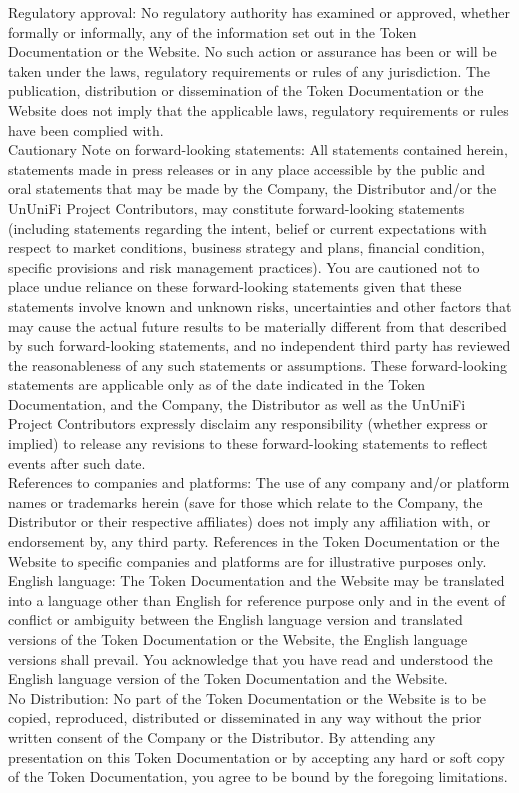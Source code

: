 \documentclass[dvipdfmx]{jsarticle}
\begin{document}
Regulatory approval: No regulatory authority has examined or approved, whether formally or informally, any of the information set out in the Token Documentation or the Website. No such action or assurance has been or will be taken under the laws, regulatory requirements or rules of any jurisdiction. The publication, distribution or dissemination of the Token Documentation or the Website does not imply that the applicable laws, regulatory requirements or rules have been complied with.\\
Cautionary Note on forward-looking statements: All statements contained herein, statements made in press releases or in any place accessible by the public and oral statements that may be made by the Company, the Distributor and/or the UnUniFi Project Contributors, may constitute forward-looking statements (including statements regarding the intent, belief or current expectations with respect to market conditions, business strategy and plans, financial condition, specific provisions and risk management practices). You are cautioned not to place undue reliance on these forward-looking statements given that these statements involve known and unknown risks, uncertainties and other factors that may cause the actual future results to be materially different from that described by such forward-looking statements, and no independent third party has reviewed the reasonableness of any such statements or assumptions. These forward-looking statements are applicable only as of the date indicated in the Token Documentation, and the Company, the Distributor as well as the UnUniFi Project Contributors expressly disclaim any responsibility (whether express or implied) to release any revisions to these forward-looking statements to reflect events after such date.\\
References to companies and platforms: The use of any company and/or platform names or trademarks herein (save for those which relate to the Company, the Distributor or their respective affiliates) does not imply any affiliation with, or endorsement by, any third party. References in the Token Documentation or the Website to specific companies and platforms are for illustrative purposes only.\\
English language: The Token Documentation and the Website may be translated into a language other than English for reference purpose only and in the event of conflict or ambiguity between the English language version and translated versions of the Token Documentation or the Website, the English language versions shall prevail. You acknowledge that you have read and understood the English language version of the Token Documentation and the Website.\\
No Distribution: No part of the Token Documentation or the Website is to be copied, reproduced, distributed or disseminated in any way without the prior written consent of the Company or the Distributor. By attending any presentation on this Token Documentation or by accepting any hard or soft copy of the Token Documentation, you agree to be bound by the foregoing limitations.\\
\end{document}
